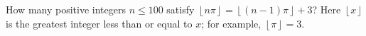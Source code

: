 How many positive integers $n\leq100$ satisfy $\left\lfloor n\pi\right\rfloor=\left\lfloor\left(n-1\right)\pi\right\rfloor+3$? Here $\left\lfloor x\right\rfloor$ is the greatest integer less than or equal to $x$; for example, $\left\lfloor\pi\right\rfloor=3$.